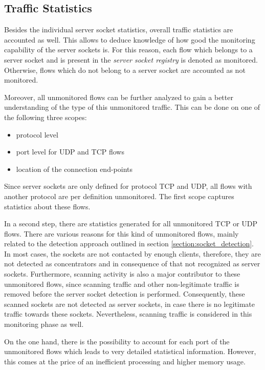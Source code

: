 \subsection{Traffic Statistics}

Besides the individual \gls{server socket} statistics, overall traffic statistics are accounted as well. 
This allows to deduce knowledge of how good the monitoring capability of the \glspl{server socket} is. 
For this reason, each flow which belongs to a \gls{server socket} and is present in the \emph{server socket registry} is denoted as monitored. 
Otherwise, flows which do not belong to a \gls{server socket} are accounted as not monitored.

Moreover, all unmonitored flows can be further analyzed to gain a better understanding of the type of this unmonitored traffic. This can be done on one of the following three scopes:
\begin{itemize}
	\item protocol level
	\item port level for \gls{UDP} and \gls{TCP} flows
	\item location of the connection end-points
\end{itemize}

Since \glspl{server socket} are only defined for protocol \gls{TCP} and \gls{UDP}, all flows with another protocol are per definition unmonitored. The first scope captures statistics about these flows.

In a second step, there are statistics generated for all unmonitored \gls{TCP} or \gls{UDP} flows. 
There are various reasons for this kind of unmonitored flows, mainly related to the detection approach outlined in section \ref{section:socket_detection}. 
In most cases, the sockets are not contacted by enough clients, therefore, they are not detected as concentrators and in consequence of that not recognized as \glspl{server socket}. 
Furthermore, scanning activity is also a major contributor to these unmonitored flows, since scanning traffic and other non-legitimate traffic is removed before the \gls{server socket} detection is performed. 
Consequently, these scanned sockets are not detected as \glspl{server socket}, in case there is no legitimate traffic towards these sockets. 
Nevertheless, scanning traffic is considered in this monitoring phase as well.

On the one hand, there is the possibility to account for each port of the unmonitored flows which leads to very detailed statistical information.
However, this comes at the price of an inefficient processing and higher memory usage.

